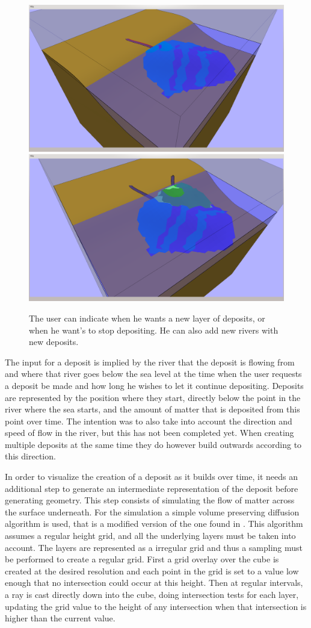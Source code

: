 \documentclass[a4paper,12pt]{report}
\begin{document}
\begin{figure}
\includegraphics[trim = 120mm 7mm 30mm 30mm, clip,width=.5\linewidth]{thesis/results/depositLayered.png}
\includegraphics[trim = 120mm 7mm 30mm 30mm, clip,width=.5\linewidth]{thesis/results/depositNew.png}
 \caption{The user can indicate when he wants a new layer of deposits, or when he want's to stop depositing. He can also add new rivers with new deposits.}
 \label{fig:depositLayer}
\end{figure}

 The input for a deposit is implied by the river that the deposit is flowing from and where that river goes below the sea level at the time when the user requests a deposit be made and how long he wishes to let it continue depositing. Deposits are represented by the position where they start, directly below the point in the river where the sea starts, and the amount of matter that is deposited from this point over time. The intention was to also take into account the direction and speed of flow in the river, but this has not been completed yet. When creating multiple deposits at the same time they do however build outwards according to this direction.

In order to visualize the creation of a deposit as it builds over time, it needs an additional step to generate an intermediate representation of the deposit before generating geometry. This step consists of simulating the flow of matter across the surface underneath. For the simulation a simple volume preserving diffusion algorithm is used, that is a modified version of the one found in \cite{Boesch:2011:Online}. This algorithm assumes a regular height grid, and all the underlying layers must be taken into account. The layers are represented as a irregular grid and thus a sampling must be performed to create a regular grid. First a grid overlay over the cube is created at the desired resolution and each point in the grid is set to a value low enough that no intersection could occur at this height. Then at regular intervals, a ray is cast directly down into the cube, doing intersection tests for each layer, updating the grid value to the height of any intersection when that intersection is higher than the 
current value.
\end{document}

